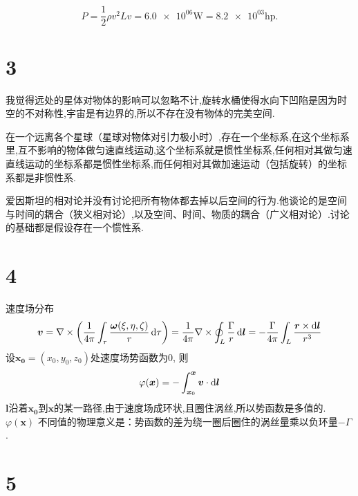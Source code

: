 \documentclass[12pt]{article}
\begin{document}
\subsection{}

\begin{equation}
	P = \frac{1}{2}\rho v^2 L v =  \num{6.0e+06} \si{\watt} = \num{8.2e+03} \mathrm{hp} .
\end{equation}

\section{3}

我觉得远处的星体对物体的影响可以忽略不计,旋转水桶使得水向下凹陷是因为时空的不对称性,宇宙是有边界的,所以不存在没有物体的完美空间.

在一个远离各个星球（星球对物体对引力极小时）,存在一个坐标系,在这个坐标系里,互不影响的物体做匀速直线运动,这个坐标系就是惯性坐标系,任何相对其做匀速直线运动的坐标系都是惯性坐标系,而任何相对其做加速运动（包括旋转）的坐标系都是非惯性系.

爱因斯坦的相对论并没有讨论把所有物体都去掉以后空间的行为.他谈论的是空间与时间的耦合（狭义相对论）,以及空间、时间、物质的耦合（广义相对论）.讨论的基础都是假设存在一个惯性系.


\section{4}

速度场分布
\begin{equation}
	\bm{v} = \nabla \times \left(\frac{1}{4\pi}\int_\tau \frac{\bm{\omega}(\xi,\eta ,\zeta )}{r} \dif \tau \right) = \frac{1}{4\pi} \nabla \times \oint_L \frac{\Gamma}{r} \dif \bm{l} = - \frac{\Gamma}{4\pi} \int_L \frac{\bm{r}\times \dif \bm{l}}{r^3}
\end{equation}
设$\bm{x_0}=(x_0,y_0,z_0)$处速度场势函数为$0$, 则
\begin{equation}
	\varphi(\bm{x}) = - \int_{\bm{x}_0}^{\bm{x}} \bm{v} \cdot \dif \bm{l} 
\end{equation}
$\bm{l}$沿着$\bm{x_0}$到$\bm{x}$的某一路径,由于速度场成环状,且圈住涡丝,所以势函数是多值的.$\varphi(\bm{x})$ 不同值的物理意义是：势函数的差为绕一圈后圈住的涡丝量乘以负环量$-\Gamma$.

\section{5}
\end{document}
